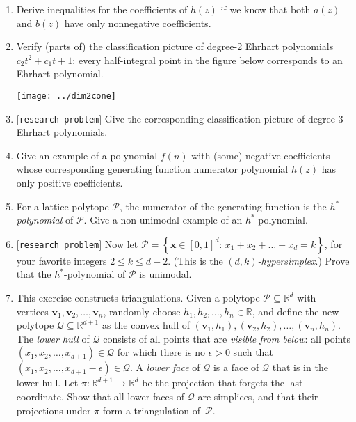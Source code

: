 \documentclass[11pt]{article}
\def\bv{\mathbf{v}}
\def\bx{\mathbf{x}}
\def\cP{\mathcal{P}}
\def\cQ{\mathcal{Q}}
\def\RR{\mathbb{R}}
\def\open{$[${\tt research problem}$]$ }
\begin{document}
\begin{enumerate}[(1)]
\item Derive inequalities for the coefficients of $h(z)$ if we know that both $a(z)$ and $b(z)$ have only nonnegative
coefficients.

\item Verify (parts of) the classification picture of degree-2 Ehrhart polynomials $c_2 t^2 + c_1 t + 1$: every
half-integral point in the figure below corresponds to an Ehrhart polynomial.

\begin{center}
\texttt{[image: ../dim2cone]}
\end{center}

\item \open Give the corresponding classification picture of degree-3 Ehrhart polynomials. 
 
\item Give an example of a polynomial $f(n)$ with (some) negative coefficients whose corresponding generating function
numerator polynomial $h(z)$ has only positive coefficients.

\item For a lattice polytope $\cP$, the numerator of the generating function is the \emph{$h^*$-polynomial} of $\cP$.
Give a non-unimodal example of an $h^*$-polynomial.

\item \open
Now let
$\cP = \left\{ \bx \in [0,1]^d : \, x_1 + x_2 + \dots + x_d = k \right\}$,
for your favorite integers $2 \le k \le d-2$. 
(This is the \emph{$(d, k)$-hypersimplex}.)
Prove that the $h^*$-polynomial of $\cP$ is unimodal.
 
\item This exercise constructs triangulations.
Given a polytope $\cP \subseteq \RR^d$ with vertices $\bv_1, \bv_2, \dots, \bv_n$, randomly choose $h_1, h_2,
\dots, h_n \in \RR$, and define the new polytope $\cQ \subseteq \RR^{ d+1 }$ as the convex hull of
$(\bv_1, h_1), (\bv_2, h_2), \dots, (\bv_n, h_n)$.
The \emph{lower hull} of $\cQ$ consists of all points that are \emph{visible from below}: all points $(x_1, x_2, \dots, x_{ d+1 }) \in \cQ$ for which there is no $\epsilon > 0$ such that $(x_1, x_2, \dots, x_{ d+1 } - \epsilon) \in \cQ$.
A \emph{lower face} of $\cQ$ is a face of $\cQ$ that is in the lower hull.
Let $\pi : \RR^{ d+1 } \to \RR^d$ be the projection that forgets the last coordinate. 
Show that all lower faces of $\cQ$ are simplices, and that their projections under $\pi$ form a triangulation of~$\cP$.

\end{enumerate}
\end{document}
